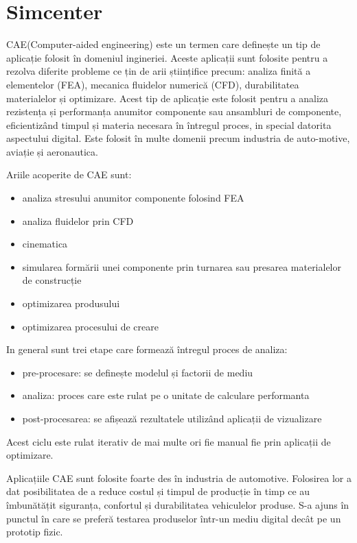\newpage
\section{Simcenter}

CAE(Computer-aided engineering) este un termen care definește un tip de aplicație folosit în domeniul ingineriei. Aceste aplicații sunt folosite pentru
 a rezolva diferite probleme ce țin de arii științifice precum: analiza finită a elementelor (FEA), mecanica fluidelor numerică (CFD), 
 durabilitatea materialelor și optimizare. Acest tip de aplicație este folosit pentru a analiza rezistența și performanța anumitor componente 
 sau ansambluri de componente, eficientizând timpul și materia necesara în întregul proces, in special datorita aspectului digital.
Este folosit în multe domenii precum industria de auto-motive, aviație și aeronautica. \cite{cae}\newline

Ariile acoperite de CAE sunt:
\begin{itemize}
\item analiza stresului anumitor componente folosind FEA
\item analiza fluidelor prin CFD
\item cinematica
\item simularea formării unei componente prin turnarea sau presarea materialelor de construcție
\item optimizarea produsului 
\item optimizarea procesului de creare
\end{itemize}

In general sunt trei etape care formează întregul proces de analiza:
\begin{itemize}
    \item pre-procesare: se definește modelul și factorii de mediu 
    \item analiza: proces care este rulat pe o unitate de calculare performanta
    \item post-procesarea: se afișează rezultatele utilizând aplicații de vizualizare
\end{itemize}

Acest ciclu este rulat iterativ de mai multe ori fie manual fie prin aplicații de optimizare.\newline

Aplicațiile CAE sunt folosite foarte des în industria de automotive. Folosirea lor a dat posibilitatea de a 
reduce costul și timpul de producție în timp ce au îmbunătățit siguranța, confortul și durabilitatea vehiculelor produse. 
S-a ajuns în punctul în care se preferă testarea produselor într-un mediu digital decât pe un prototip fizic.\cite{cae}\newline

